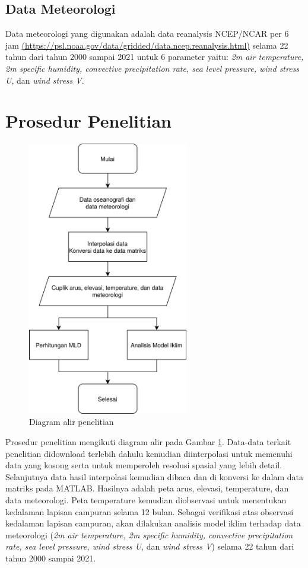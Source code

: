 \begin{spacing}{1.5}
\subsection[Data Meteorologi]{Data Meteorologi}
	Data meteorologi yang digunakan adalah data reanalysis NCEP/NCAR per 6 jam \href{https://psl.noaa.gov/data/gridded/data.ncep.reanalysis.html}{(https://psl.noaa.gov/data/gridded/data.ncep.reanalysis.html)} selama 22 tahun dari tahun 2000 sampai 2021 untuk 6 parameter yaitu: \textit{2m air temperature, 2m specific humidity, convective precipitation rate, sea level pressure, wind stress U}, dan \textit{wind stress V}.
\end{spacing}
\vspace{-0.5pc}
\section[Prosedur Penelitian]{Prosedur Penelitian}
\begin{spacing}{1.5}
	\begin{figure}[H]
		\centering
		\includegraphics[width=7cm]{contents/flowchart.png}
		\caption{Diagram alir penelitian}
		\label{fig:flowchart}
	\end{figure}
	Prosedur penelitian mengikuti diagram alir pada Gambar \ref{fig:flowchart}. Data-data terkait penelitian didownload terlebih dahulu kemudian diinterpolasi untuk memenuhi data yang kosong serta untuk memperoleh resolusi spasial yang lebih detail. Selanjutnya data hasil interpolasi kemudian dibaca dan di konversi ke dalam data matriks pada MATLAB. Hasilnya adalah peta arus, elevasi, temperature, dan data meteorologi. Peta temperature kemudian diobservasi untuk menentukan kedalaman lapisan campuran selama 12 bulan. Sebagai verifikasi atas observasi kedalaman lapisan campuran, akan dilakukan analisis model iklim terhadap data meteorologi (\textit{2m air temperature, 2m specific humidity, convective precipitation rate, sea level pressure, wind stress U}, dan \textit{wind stress V}) selama 22 tahun dari tahun 2000 sampai 2021.
\end{spacing}